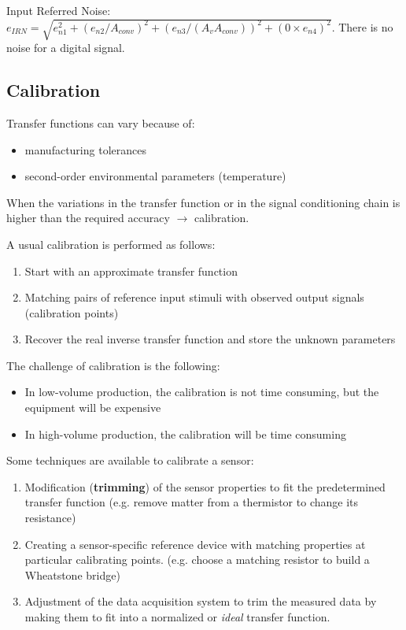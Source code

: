 Input Referred Noise: $e_{IRN} = \sqrt{e_{n1}^2 + (e_{n2}/A_{conv})^2 + (e_{n3}/(A_v A_{conv}))^2  + (0\times e_{n4}) ^2}$. There is no noise for a digital signal.

\subsection{Calibration}

Transfer functions can vary because of:
\begin{itemize}
    \item  manufacturing tolerances
    \item second-order environmental parameters (temperature)
\end{itemize}
When the variations in the transfer function
or in the signal conditioning chain is higher than the required accuracy $\rightarrow$ calibration.

A usual calibration is performed as follows:

\begin{enumerate}
    \item Start with an approximate transfer function
    \item Matching pairs of reference input stimuli with
observed output signals (calibration points)    
    \item Recover the real inverse transfer function and
store the unknown parameters
\end{enumerate}
The challenge of calibration is the following:

\begin{itemize}
    \item In low-volume production, the calibration is not time consuming, but the equipment will be expensive
    \item In high-volume production, the calibration will be time consuming
\end{itemize}
Some techniques are available to calibrate a sensor:

\begin{enumerate}
   \item Modification (\textbf{trimming}) of the sensor properties to
fit the predetermined transfer function (e.g. remove matter from a thermistor to change its resistance) 
    \item Creating a sensor-specific reference device with
matching properties at particular calibrating points. (e.g. choose a matching resistor to build a Wheatstone bridge)
    \item Adjustment of the data acquisition system to trim
the measured data by making them to fit into a
normalized or \textit{ideal} transfer function.
\end{enumerate}

    
